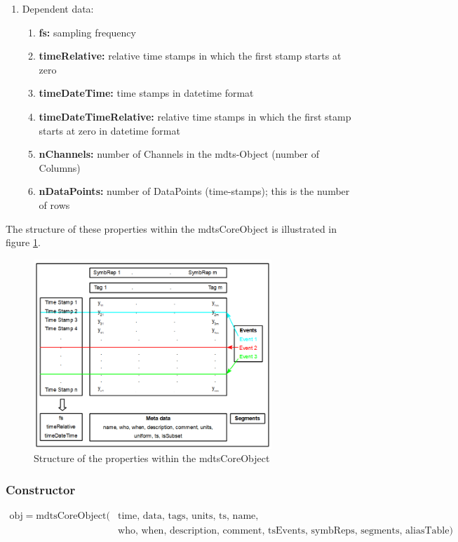 \documentclass[a4]{scrreprt}
\begin{document}
\begin{enumerate}
\begin{enumerate}
	\end{enumerate}
	\item Dependent data:
	\begin{enumerate}	
		\item \textbf{fs:} sampling frequency
		\item \textbf{timeRelative:} relative time stamps in which the first stamp starts at zero
		\item \textbf{timeDateTime:} time stamps in datetime format
		\item \textbf{timeDateTimeRelative:} relative time stamps in which the first stamp starts at zero in datetime format
		\item \textbf{nChannels:} number of Channels in the mdts-Object (number of Columns)
		\item \textbf{nDataPoints:} number of DataPoints (time-stamps); this is the number of rows
	\end{enumerate}
\end{enumerate}

The structure of these properties within the mdtsCoreObject is illustrated in figure \ref{FigmdtsCoreObjectStructure}.

\begin{figure}[htb]
	\centering
	\includegraphics[width=0.8\textwidth]{Media/mdtsCoreObjectStructure.png}
	\caption{Structure of the properties within the mdtsCoreObject}
	\label{FigmdtsCoreObjectStructure}
\end{figure}

\subsubsection{Constructor}

\begin{align*}
\text{obj} = \text{mdtsCoreObject}(&\text{time, }\text{data,  }\text{tags, }\text{units, }\text{ts, }\text{name, }\\&\text{who, }\text{when, }\text{description, }\text{comment, }\text{tsEvents, }\text{symbReps, }\text{segments, }\text{aliasTable})
\end{align*}
\end{document}
